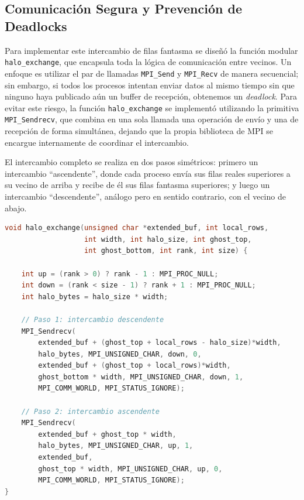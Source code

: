 \subsection{Comunicación Segura y Prevención de Deadlocks}

Para implementar este intercambio de filas fantasma se diseñó la función modular \texttt{halo\_exchange}, que encapsula toda la lógica de comunicación entre vecinos. Un enfoque es utilizar el par de llamadas \texttt{MPI\_Send} y \texttt{MPI\_Recv} de manera secuencial; sin embargo, si todos los procesos intentan enviar datos al mismo tiempo sin que ninguno haya publicado aún un buffer de recepción, obtenemos un \textit{deadlock}. Para evitar este riesgo, la función \texttt{halo\_exchange} se implementó utilizando la primitiva \texttt{MPI\_Sendrecv}, que combina en una sola llamada una operación de envío y una de recepción de forma simultánea, dejando que la propia biblioteca de MPI se encargue internamente de coordinar el intercambio.

El intercambio completo se realiza en dos pasos simétricos: primero un intercambio ``ascendente'', donde cada proceso envía sus filas reales superiores a su vecino de arriba y recibe de él sus filas fantasma superiores; y luego un intercambio ``descendente'', análogo pero en sentido contrario, con el vecino de abajo.

\begin{lstlisting}[language=C, caption={Función de intercambio de halos con \texttt{MPI\_Sendrecv}}, label=list:halo_exchange]
void halo_exchange(unsigned char *extended_buf, int local_rows,
                   int width, int halo_size, int ghost_top,
                   int ghost_bottom, int rank, int size) {

    int up = (rank > 0) ? rank - 1 : MPI_PROC_NULL;
    int down = (rank < size - 1) ? rank + 1 : MPI_PROC_NULL;
    int halo_bytes = halo_size * width;

    // Paso 1: intercambio descendente
    MPI_Sendrecv(
        extended_buf + (ghost_top + local_rows - halo_size)*width,
        halo_bytes, MPI_UNSIGNED_CHAR, down, 0,
        extended_buf + (ghost_top + local_rows)*width,
        ghost_bottom * width, MPI_UNSIGNED_CHAR, down, 1,
        MPI_COMM_WORLD, MPI_STATUS_IGNORE);

    // Paso 2: intercambio ascendente
    MPI_Sendrecv(
        extended_buf + ghost_top * width,
        halo_bytes, MPI_UNSIGNED_CHAR, up, 1,
        extended_buf,
        ghost_top * width, MPI_UNSIGNED_CHAR, up, 0,
        MPI_COMM_WORLD, MPI_STATUS_IGNORE);
}
\end{lstlisting}

